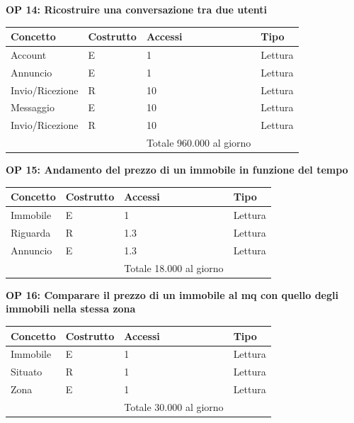 \documentclass[a4paper,12pt]{report}
\begin{document}
            \textbf{OP 14: Ricostruire una conversazione tra due utenti}
        	\begin{table}[H]
            \centering
             \begin{tabular}{||l l l l||}
             \hline
             Concetto & Costrutto & Accessi & Tipo \\ [0.5ex] 
             \hline\hline
             Account & E & 1 & Lettura \\ 
             Annuncio & E & 1 & Lettura \\ 
             Invio/Ricezione & R & 10 & Lettura \\ 
             Messaggio & E & 10 & Lettura \\ 
             Invio/Ricezione & R & 10 & Lettura \\ 
             \hline
                &   & Totale  960.000 al giorno &  \\ [1ex] 
             \hline
             \end{tabular}
            \end{table}

             \textbf{OP 15: Andamento del prezzo di un immobile in funzione del tempo}
        	\begin{table}[H]
            \centering
             \begin{tabular}{||l l l l||}
             \hline
             Concetto & Costrutto & Accessi & Tipo \\ [0.5ex] 
             \hline\hline
             Immobile & E & 1 & Lettura \\ 
             Riguarda & R & 1.3 & Lettura \\ 
             Annuncio & E & 1.3 & Lettura \\ 
             \hline
                &   & Totale  18.000 al giorno &  \\ [1ex] 
             \hline
             \end{tabular}
            \end{table}

            \textbf{OP 16: Comparare il prezzo di un immobile al mq con quello degli immobili nella stessa zona}
        	\begin{table}[H]
            \centering
             \begin{tabular}{||l l l l||}
             \hline
             Concetto & Costrutto & Accessi & Tipo \\ [0.5ex] 
             \hline\hline
             Immobile & E & 1 & Lettura \\ 
             Situato & R & 1 & Lettura \\ 
             Zona & E & 1 & Lettura \\ 
             \hline
                &   & Totale  30.000 al giorno &  \\ [1ex] 
             \hline
             \end{tabular}
            \end{table}
\end{document}
